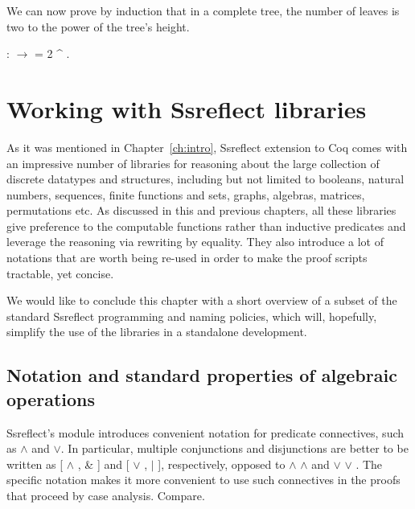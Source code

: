 \begin{exercise}
\noindent
We can now prove by induction that in a complete tree, the number of leaves
is two to the power of the tree's height.


\begin{coqdoccode}
\coqdocemptyline
\coqdocnoindent
{}   :   \ensuremath{\rightarrow}   = 2 \^{}  .\coqdoceol
\coqdocemptyline
\end{coqdoccode}


\end{exercise}






\section{Working with Ssreflect libraries}




As it was mentioned in Chapter~\ref{ch:intro}, Ssreflect extension
to Coq comes with an impressive number of libraries for reasoning
about the large collection of discrete datatypes and structures,
including but not limited to booleans, natural numbers, sequences,
finite functions and sets, graphs, algebras, matrices, permutations
etc. As discussed in this and previous chapters, all these libraries
give preference to the computable functions rather than inductive
predicates and leverage the reasoning via rewriting by equality. They
also introduce a lot of notations that are worth being re-used in
order to make the proof scripts tractable, yet concise.


We would like to conclude this chapter with a short overview of a
subset of the standard Ssreflect programming and naming policies,
which will, hopefully, simplify the use of the libraries in a
standalone development.


\subsection{Notation and standard properties of algebraic operations}


\label{sec:funprops}


Ssreflect's module  introduces convenient notation for
predicate connectives, such as \ensuremath{\land} and \ensuremath{\lor}. In particular, multiple
conjunctions and disjunctions are better to be written as [ \ensuremath{\land} , 
\& ] and [ \ensuremath{\lor} ,  \ensuremath{|} ], respectively, opposed to  \ensuremath{\land}  \ensuremath{\land}
 and  \ensuremath{\lor}  \ensuremath{\lor} . The specific notation makes it more
convenient to use such connectives in the proofs that proceed by case
analysis. Compare.


